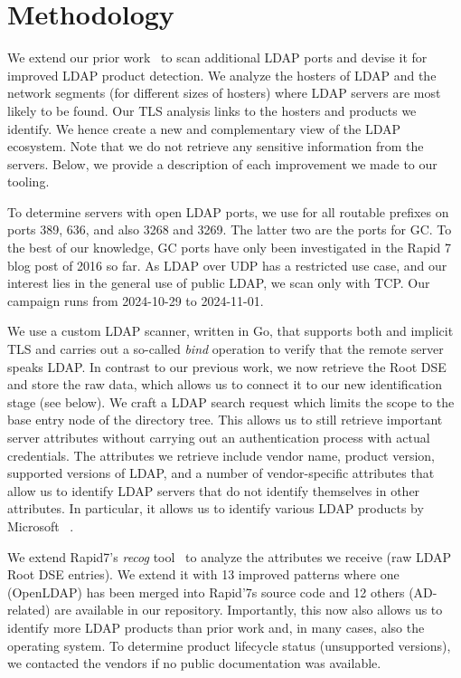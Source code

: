 \section{Methodology}
\label{sec:methodology}
We extend our prior work~\cite{landscape} to scan additional \gls{LDAP} ports and devise it for improved \gls{LDAP} product detection. We analyze the hosters of \gls{LDAP} and the network segments (for different sizes of hosters) where \gls{LDAP} servers are most likely to be found. Our \gls{TLS} analysis links to the hosters and products we identify. We hence create a new and complementary view of the \gls{LDAP} ecosystem. Note that we do not retrieve any sensitive information from the servers. Below, we provide a description of each improvement we made to our tooling.

To determine servers with open \gls{LDAP} ports, we use \zmap for all routable prefixes on ports 389, 636, and also 3268 and 3269. The latter two are the ports for \gls{GC}. To the best of our knowledge, \gls{GC} ports have only been investigated in the Rapid 7 blog post of 2016 so far. As \gls{LDAP} over UDP has a restricted use case, and our interest lies in the general use of public \gls{LDAP}, we scan only with TCP. Our campaign runs from 2024-10-29 to 2024-11-01.

We use a custom \gls{LDAP} scanner, written in Go, that supports both \starttls and implicit \gls{TLS} and carries out a so-called \textit{bind} operation to verify that the remote server speaks \gls{LDAP}.
In contrast to our previous work, we now retrieve the Root \gls{DSE} and store the raw data, which allows us to connect it to our new identification stage (see below).
We craft a \gls{LDAP} search request 
which limits the scope to the base entry node of the directory tree. This allows us to still retrieve important server attributes without carrying out an authentication process with actual credentials. The attributes we retrieve include vendor name, product version, supported versions of \gls{LDAP}, and a number of vendor-specific attributes that allow us to identify \gls{LDAP} servers that do not identify themselves in other attributes. In particular, it allows us to identify various \gls{LDAP} products by Microsoft ~\cite{ms-ldap-attr}.

\label{subsec:ldap_deploy_host}
We extend Rapid7's \textit{recog} tool~\cite{recog} to analyze the attributes we receive (raw \gls{LDAP} Root DSE entries). We extend it with 13 improved patterns where one (OpenLDAP) has been merged into Rapid'7s source code and 12 others (\gls{AD}-related) are available in our repository. Importantly, this now also allows us to identify more \gls{LDAP} products than prior work and, in many cases, also the operating system. 
To determine product lifecycle status (\eg unsupported versions), we contacted the vendors if no public documentation was available.


